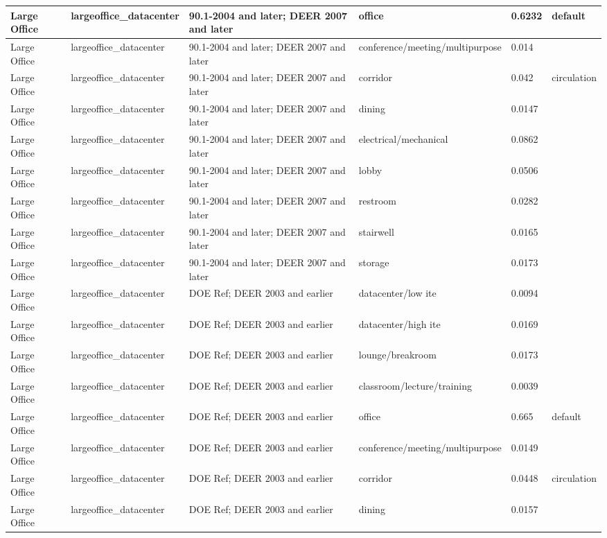 \begin{center}
\begin{longtable}{|p{1.0in}|p{1.05in}|p{1.1in}|p{1.9in}|p{0.55in}|p{0.95in}|}
Large Office & largeoffice\_datacenter & 90.1-2004 and later; DEER 2007 and later & office & 0.6232 & default \\ \hline
Large Office & largeoffice\_datacenter & 90.1-2004 and later; DEER 2007 and later & conference/meeting/multipurpose & 0.014 &  \\ \hline
Large Office & largeoffice\_datacenter & 90.1-2004 and later; DEER 2007 and later & corridor & 0.042 & circulation \\ \hline
Large Office & largeoffice\_datacenter & 90.1-2004 and later; DEER 2007 and later & dining & 0.0147 &  \\ \hline
Large Office & largeoffice\_datacenter & 90.1-2004 and later; DEER 2007 and later & electrical/mechanical & 0.0862 &  \\ \hline
Large Office & largeoffice\_datacenter & 90.1-2004 and later; DEER 2007 and later & lobby & 0.0506 &  \\ \hline
Large Office & largeoffice\_datacenter & 90.1-2004 and later; DEER 2007 and later & restroom & 0.0282 &  \\ \hline
Large Office & largeoffice\_datacenter & 90.1-2004 and later; DEER 2007 and later & stairwell & 0.0165 &  \\ \hline
Large Office & largeoffice\_datacenter & 90.1-2004 and later; DEER 2007 and later & storage & 0.0173 &  \\ \hline
Large Office & largeoffice\_datacenter & DOE Ref; DEER 2003 and earlier & datacenter/low ite & 0.0094 &  \\ \hline
Large Office & largeoffice\_datacenter & DOE Ref; DEER 2003 and earlier & datacenter/high ite & 0.0169 &  \\ \hline
Large Office & largeoffice\_datacenter & DOE Ref; DEER 2003 and earlier & lounge/breakroom & 0.0173 &  \\ \hline
Large Office & largeoffice\_datacenter & DOE Ref; DEER 2003 and earlier & classroom/lecture/training & 0.0039 &  \\ \hline
Large Office & largeoffice\_datacenter & DOE Ref; DEER 2003 and earlier & office & 0.665 & default \\ \hline
Large Office & largeoffice\_datacenter & DOE Ref; DEER 2003 and earlier & conference/meeting/multipurpose & 0.0149 &  \\ \hline
Large Office & largeoffice\_datacenter & DOE Ref; DEER 2003 and earlier & corridor & 0.0448 & circulation \\ \hline
Large Office & largeoffice\_datacenter & DOE Ref; DEER 2003 and earlier & dining & 0.0157 &  \\ \hline

\end{longtable}
\end{center}

